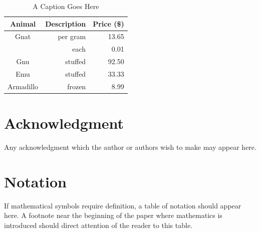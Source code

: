 \documentclass[]{AVSSimReportMemo}
\begin{document}
\begin{table}[htbp]
    \caption{A Caption Goes Here}
   \label{tab:label}
        \centering \fontsize{10}{10}\selectfont
   \begin{tabular}{c | r | r } %
      \hline 
      Animal    & Description & Price (\$)\\
      \hline 
      Gnat      & per gram & 13.65 \\
                & each     &  0.01 \\
      Gnu       & stuffed  & 92.50 \\
      Emu       & stuffed  & 33.33 \\
      Armadillo & frozen   &  8.99 \\
      \hline
   \end{tabular}
\end{table}



\section{Acknowledgment}
Any acknowledgment which the author or authors wish to make may appear here. 



\section{Notation}
If mathematical symbols require definition, a table of notation should appear here. A footnote near the beginning of the paper where mathematics is introduced should direct attention of the reader to this table.
\end{document}
